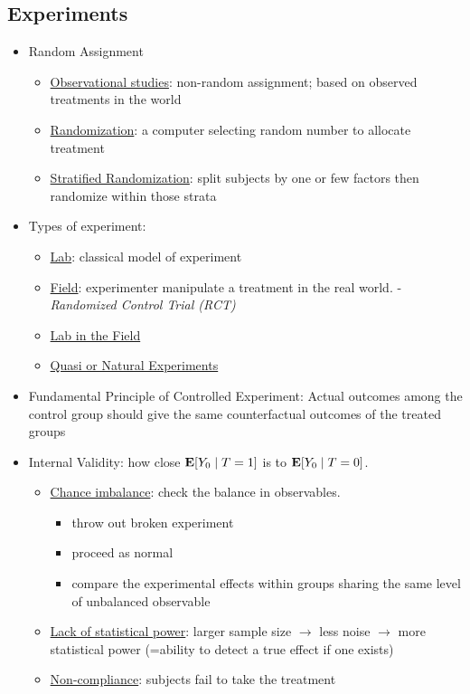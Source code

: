\documentclass[10pt, letterpaper]{article}
\def\E{\vb{E}}
\begin{document}
\begin{multicols}{2}
\section*{Experiments}
\begin{itemize}
	\item Random Assignment
	\begin{itemize}
		\item \underline{Observational studies}: non-random assignment; based on observed treatments in the world
		\item \underline{Randomization}: a computer selecting random number to allocate treatment
		\item \underline{Stratified Randomization}: split subjects by one or few factors then randomize within those strata
	\end{itemize}
	\item Types of experiment:
	\begin{itemize}
		\item \underline{Lab}: classical model of experiment
		\item \underline{Field}: experimenter manipulate a treatment in the real world. -\textit{Randomized Control Trial (RCT)}
		\item \underline{Lab in the Field}
		\item \underline{Quasi or Natural Experiments}
	\end{itemize}
	\item Fundamental Principle of Controlled Experiment: Actual outcomes among the control group should give the same counterfactual outcomes of the treated groups
	\item Internal Validity: how close $\E[Y_0\mid T=1]$ is to $\E[Y_0\mid T=0]$.
	\begin{itemize}
		\item \underline{Chance imbalance}: check the balance in observables. 
		\begin{itemize}
			\item throw out broken experiment
			\item proceed as normal
			\item compare the experimental effects within groups sharing the same level of unbalanced observable
		\end{itemize}
		\item \underline{Lack of statistical power}: larger sample size $\rightarrow$ less noise $\rightarrow$ more statistical power (=ability to detect a true effect if one exists)
		\item \underline{Non-compliance}: subjects fail to take the treatment

\end{itemize}
\end{itemize}
\end{multicols}
\end{document}
